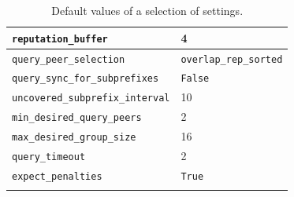 \begin{longtable}{|l|l|}
\hline
\cellcolor{slightgray}\T \texttt{reputation\_buffer} & 4 \B\\
\hline
\cellcolor{slightgray}\T \texttt{query\_peer\_selection} & \texttt{overlap\_rep\_sorted} \B\\
\hline
\cellcolor{slightgray}\T \texttt{query\_sync\_for\_subprefixes} & \texttt{False} \B\\
\hline
\cellcolor{slightgray}\T \texttt{uncovered\_subprefix\_interval} & 10 \B\\
\hline
\cellcolor{slightgray}\T \texttt{min\_desired\_query\_peers} & 2 \B\\
\hline
\cellcolor{slightgray}\T \texttt{max\_desired\_group\_size} & 16 \B\\
\hline
\cellcolor{slightgray}\T \texttt{query\_timeout} & 2 \B\\
\hline
\cellcolor{slightgray}\T \texttt{expect\_penalties} & \texttt{True} \B\\
\hline
\caption{Default values of a selection of settings.}
\label{tab:default_settings}
\end{longtable}

